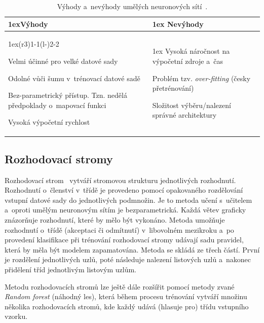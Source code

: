 \begin{table}[H]
\begin{tabularx}{\linewidth}{>{\parskip1ex}X@{\kern4\tabcolsep}>{\parskip1ex}X}
\toprule
\hfil\bfseries Výhody
&
\hfil\bfseries Nevýhody
\\\cmidrule(r{3\tabcolsep}){1-1}\cmidrule(l{-\tabcolsep}){2-2}

Velmi účinné pro velké datové sady\par
Odolné vůči šumu v~trénovací datové sadě\par
Bez-parametrický přístup. Tzn. nedělá předpoklady o~mapovací funkci\par
Vysoká výpočetní rychlost
&
Vysoká náročnost na výpočetní zdroje a~čas\par
Problém tzv. \emph{over-fitting} (česky přetrénování)\par
Složitost výběru/nalezení správné architektury


\\\bottomrule
\end{tabularx}
\caption{Výhody a~nevýhody umělých neuronových sítí~\cite{classificMethodsComp2, classificMethodsComp3}.}
\end{table}

\subsection*{Rozhodovací stromy}
\label{rozhodovaciStromy}
Rozhodovací strom~\cite{classificMethodsComp2, classificMethodsComp3} vytváří stromovou strukturu jednotlivých rozhodnutí. Rozhodnutí o~členství v~třídě je provedeno pomocí opakovaného rozdělování vstupní datové sady do jednotlivých podmnožin. Je to metoda učení s~učitelem a~oproti umělým neuronovým sítím je bezparametrická. Každá větev graficky znázorňuje rozhodnutí, které by mělo být vykonáno. Metoda umožňuje rozhodnutí o~třídě (akceptaci či odmítnutí) v~libovolném mezikroku a~po provedení klasifikace při trénování rozhodovací stromy udávají sadu pravidel, která by měla být modelem zapamatována. Metoda se skládá ze třech částí. První je rozdělení jednotlivých uzlů, poté následuje nalezení listových uzlů a~nakonec přidělení tříd jednotlivým listovým uzlům.

Metodu rozhodovacích stromů lze ještě dále rozšířit pomocí metody zvané \emph{Random forest} (náhodný les), která během procesu trénování vytváří množinu několika rozhodovacích stromů, kde každý udává (hlasuje pro) třídu vstupního vzorku.

